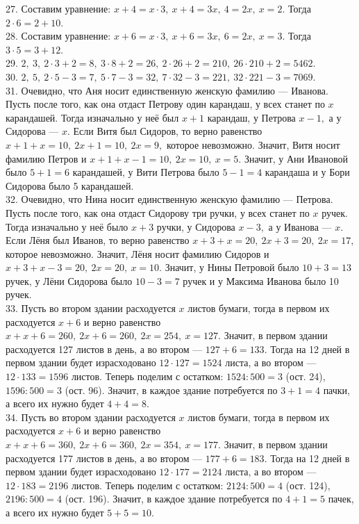 \documentclass[12pt]{article}
\begin{document}
27. Составим уравнение: $x+4=x\cdot3,\ x+4=3x,\ 4=2x,\ x=2.$ Тогда $2\cdot6=2+10.$\\
28. Составим уравнение: $x+6=x\cdot3,\ x+6=3x,\ 6=2x,\ x=3.$ Тогда $3\cdot5=3+12.$\\
29. $2,\ 3,\ 2\cdot3+2=8,\ 3\cdot8+2=26,\ 2\cdot26+2=210,\ 26\cdot210+2=5462.$\\
30. $2,\ 5,\ 2\cdot5-3=7,\ 5\cdot7-3=32,\ 7\cdot32-3=221,\ 32\cdot221-3=7069.$\\
31. Очевидно, что Аня носит единственную женскую фамилию --- Иванова. Пусть после того, как она отдаст Петрову один карандаш, у всех станет по $x$ карандашей. Тогда изначально у неё был $x+1$ карандаш, у Петрова $x-1,$ а у Сидорова --- $x.$ Если Витя был Сидоров, то верно равенство $x+1+x=10,\ 2x+1=10,\ 2x=9,$ которое невозможно. Значит, Витя носит фамилию Петров и $x+1+x-1=10,\ 2x=10,\ x=5.$ Значит, у Ани Ивановой было $5+1=6$ карандашей, у Вити Петрова было $5-1=4$ карандаша и у Бори Сидорова было 5 карандашей.\\
32. Очевидно, что Нина носит единственную женскую фамилию --- Петрова. Пусть после того, как она отдаст Сидорову три ручки, у всех станет по $x$ ручек. Тогда изначально у неё было $x+3$ ручки, у Сидорова $x-3,$ а у Иванова --- $x.$ Если Лёня был Иванов, то верно равенство $x+3+x=20,\ 2x+3=20,\ 2x=17,$ которое невозможно. Значит, Лёня носит фамилию Сидоров и $x+3+x-3=20,\ 2x=20,\ x=10.$ Значит, у Нины Петровой было $10+3=13$ ручек, у Лёни Сидорова было $10-3=7$ ручек и у Максима Иванова было 10 ручек.\\
33. Пусть во втором здании расходуется $x$ листов бумаги, тогда в первом их расходуется $x+6$ и верно равенство $x+x+6=260,\ 2x+6=260,\ 2x=254,\ x=127.$ Значит, в первом здании расходуется 127 листов в день, а во втором --- $127+6=133.$ Тогда на 12 дней в первом здании будет израсходовано $12\cdot127=1524$ листа, а во втором --- $12\cdot133=1596$ листов. Теперь поделим с остатком: $1524:500=3$ (ост. 24), $1596:500=3$ (ост. 96). Значит, в каждое здание потребуется по $3+1=4$ пачки, а всего их нужно будет $4+4=8.$\\
34. Пусть во втором здании расходуется $x$ листов бумаги, тогда в первом их расходуется $x+6$ и верно равенство $x+x+6=360,\ 2x+6=360,\ 2x=354,\ x=177.$ Значит, в первом здании расходуется 177 листов в день, а во втором --- $177+6=183.$ Тогда на 12 дней в первом здании будет израсходовано $12\cdot177=2124$ листа, а во втором --- $12\cdot183=2196$ листов. Теперь поделим с остатком: $2124:500=4$ (ост. 124), $2196:500=4$ (ост. 196). Значит, в каждое здание потребуется по $4+1=5$ пачек, а всего их нужно будет $5+5=10.$\\
\end{document}
